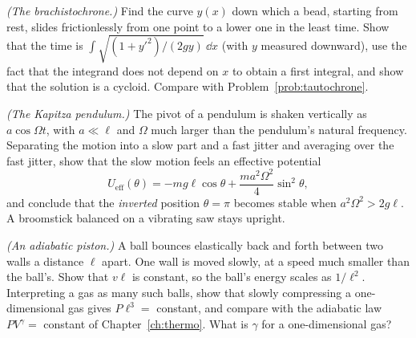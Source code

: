 \begin{problems}
\core \emph{(The brachistochrone.)} Find the curve $y(x)$ down which a bead, starting from rest, slides frictionlessly from one point to a lower one in the least time. Show that the time is $\int\sqrt{(1+y'^2)/(2gy)}\,\dd x$ (with $y$ measured downward), use the fact that the integrand does not depend on $x$ to obtain a first integral, and show that the solution is a cycloid. Compare with Problem~\ref{prob:tautochrone}.

\label{prob:kapitza} \emph{(The Kapitza pendulum.)} The pivot of a pendulum is shaken vertically as $a\cos\Omega t$, with $a\ll\ell$ and $\Omega$ much larger than the pendulum's natural frequency. Separating the motion into a slow part and a fast jitter and averaging over the fast jitter, show that the slow motion feels an effective potential
\[
  U_{\text{eff}}(\theta) = -mg\ell\cos\theta + \frac{m a^2\Omega^2}{4}\sin^2\theta,
\]
and conclude that the \emph{inverted} position $\theta=\pi$ becomes stable when $a^2\Omega^2 > 2g\ell$. A broomstick balanced on a vibrating saw stays upright.

 \emph{(An adiabatic piston.)} A ball bounces elastically back and forth between two walls a distance $\ell$ apart. One wall is moved slowly, at a speed much smaller than the ball's. Show that $v\ell$ is constant, so the ball's energy scales as $1/\ell^2$. Interpreting a gas as many such balls, show that slowly compressing a one-dimensional gas gives $P\ell^3 = $ constant, and compare with the adiabatic law $PV^\gamma=$ constant of Chapter~\ref{ch:thermo}. What is $\gamma$ for a one-dimensional gas?
\end{problems}

\begin{reading}
\end{reading}
